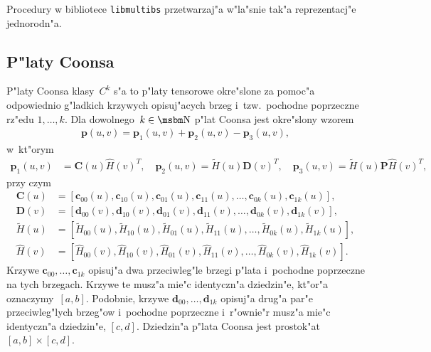 Procedury w bibliotece \texttt{libmultibs} przetwarzaj"a w"la"snie tak"a
reprezentacj"e jednorodn"a.


\subsection{\label{ssect:Coons:patch:def}P"laty Coonsa}

P"laty Coonsa klasy~$C^k$ s"a to p"laty tensorowe okre"slone za pomoc"a
odpowiednio g"ladkich krzywych opisuj"acych brzeg i~tzw.\ pochodne
poprzeczne rz"edu $1,\ldots,k$. Dla dowolnego~$k\in\N$ p"lat Coonsa jest
okre"slony wzorem
\begin{align}\label{eq:Coons:patch:def}
  \bm{p}(u,v) = \bm{p}_1(u,v)+\bm{p}_2(u,v)-\bm{p}_3(u,v),
\end{align}
w~kt"orym
\begin{align*}
  \bm{p}_1(u,v) &{}= \bm{C}(u)\hat{H}(v)^T, \quad
  \bm{p}_2(u,v) = \tilde{H}(u)\bm{D}(v)^T, \quad
  \bm{p}_3(u,v) = \tilde{H}(u)\bm{P}\hat{H}(v)^T,
\end{align*}
przy czym
\begin{align*}
  \bm{C}(u) &{}= [\bm{c}_{00}(u),\bm{c}_{10}(u),\bm{c}_{01}(u),\bm{c}_{11}(u),
               \ldots,\bm{c}_{0k}(u),\bm{c}_{1k}(u)], \\
  \bm{D}(v) &{}= [\bm{d}_{00}(v),\bm{d}_{10}(v),\bm{d}_{01}(v),\bm{d}_{11}(v),
               \ldots,\bm{d}_{0k}(v),\bm{d}_{1k}(v)], \\
  \tilde{H}(u) &{}= [\tilde{H}_{00}(u),\tilde{H}_{10}(u),
                     \tilde{H}_{01}(u),\tilde{H}_{11}(u),\ldots,
                     \tilde{H}_{0k}(u),\tilde{H}_{1k}(u)], \\
  \hat{H}(v) &{}= [\hat{H}_{00}(v),\hat{H}_{10}(v),
                     \hat{H}_{01}(v),\hat{H}_{11}(v),\ldots,
                     \hat{H}_{0k}(v),\hat{H}_{1k}(v)].
\end{align*}
Krzywe $\bm{c}_{00},\ldots,\bm{c}_{1k}$ opisuj"a dwa przeciwleg"le brzegi
p"lata i~pochodne poprzeczne na tych brzegach. Krzywe te musz"a mie"c
identyczn"a dziedzin"e, kt"or"a oznaczymy~$[a,b]$. Podobnie, krzywe
$\bm{d}_{00},\ldots,\bm{d}_{1k}$ opisuj"a drug"a par"e przeciwleg"lych
brzeg"ow i~pochodne poprzeczne i~r"ownie"r musz"a mie"c identyczn"a dziedzin"e,
$[c,d]$. Dziedzin"a p"lata Coonsa jest prostok"at $[a,b]\times[c,d]$.

